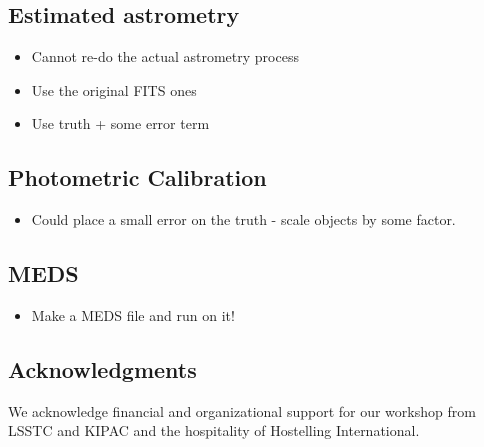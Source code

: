\documentclass[\docopts]{\docclass}
\begin{document}
\subsection{Estimated astrometry}
\begin{itemize}
\item Cannot re-do the actual astrometry process
\item Use the original FITS ones
\item Use truth + some error term
\end{itemize}

\subsection{Photometric Calibration}
\begin{itemize}
\item Could place a small error on the truth - scale objects by some factor.
\end{itemize}

\subsection{MEDS}
\begin{itemize}
\item Make a MEDS file and run on it!
\end{itemize}



\subsection*{Acknowledgments}

We acknowledge financial and organizational support for our workshop from LSSTC and KIPAC and the hospitality of Hostelling International.





\end{document}
